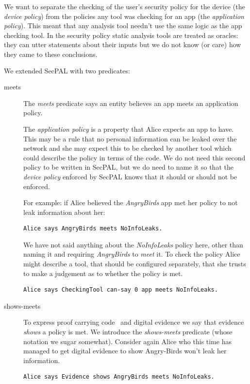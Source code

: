 \documentclass[a4paper,sfsidenotes]{%
  article%
}
\begin{document}
We want to separate the checking of the user's security policy for the device
(the \emph{device policy}) from the policies any tool was checking for an app
(the \emph{application policy}).  This meant that any analysis tool needn't use
the same logic as the app checking tool.  In the security policy static analysis
tools are treated as oracles: they can utter statements about their inputs but
we do not know (or care) how they came to these conclusions.

We extended SecPAL with two predicates:  

\begin{description}
  \item[\ttfamily meets] 
The \emph{meets} predicate says an
entity believes an app meets an application policy. 

The \emph{application policy} is a property that Alice expects an app to have.
This may be a rule that no personal information can be leaked over the network
and she may expect this to be checked by another tool which could describe the
policy in terms of the code.  We do not need this second policy to be written in
SecPAL, but we do need to name it so that the \emph{device policy} enforced by
SecPAL knows that it should or should not be enforced.

For example: if Alice believed the \emph{AngryBirds} app met her policy to not
leak information about her:

\begin{lstlisting}[language=SecPAL]
Alice says AngryBirds meets NoInfoLeaks.
\end{lstlisting}

We have not said anything about the \emph{NoInfoLeaks} policy here, other than
naming it and requiring \emph{AngryBirds} to \emph{meet} it.  To check the
policy Alice might describe a tool, that should be configured separately, that
she trusts to make a judgement as to whether the policy is met.

\begin{lstlisting}[language=SecPAL]
Alice says CheckingTool can-say 0 app meets NoInfoLeaks.
\end{lstlisting}

\item[\ttfamily shows-meets]
To express proof carrying code~\cite{Necula:1996tr} and digital
evidence we say that evidence \emph{shows} a policy is met.  
We introduce the \emph{shows-meets} predicate (whose notation we sugar
somewhat).  Consider again Alice who this time has managed to get
digital evidence to show Angry-Birds won't leak her information.

\begin{lstlisting}[language=SecPAL]
Alice says Evidence shows AngryBirds meets NoInfoLeaks.
\end{lstlisting}
\end{description}
\end{document}
